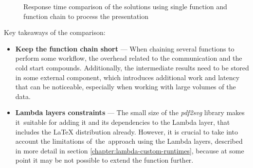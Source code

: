 \datasetChainVsSingle

\begin{figure}[]
    \begin{center}
    \caption{Response time comparison of the solutions using single function and function chain to process the presentation}
    \label{chart:step-function-single-function-vs-function-chain}
    \end{center}
\end{figure}

Key takeaways of the comparison:

\begin{itemize}
   \item \textbf{Keep the function chain short} --- When chaining several functions to perform some workflow, the overhead related to the communication and the cold start compounds. Additionally, the intermediate results need to be stored in some external component, which introduces additional work and latency that can be noticeable, especially when working with large volumes of the data.
   \item \textbf{Lambda layers constraints} --- The small size of the \textit{pdf2svg} library makes it~suitable for adding it and its dependencies to the Lambda layer, that includes the LaTeX distribution already. However, it is crucial to take into account the limitations of~the~approach using the Lambda layers, described in more detail in section \ref{chapter:lambda-custom-runtimes}, because at some point it may be not possible to extend the function further.
\end{itemize}

